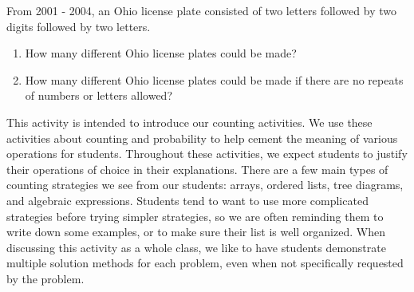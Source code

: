 \documentclass[nooutcomes]{ximera}
\begin{document}
\begin{problem}
From 2001 - 2004, an Ohio license plate consisted of two letters followed by two digits followed by two letters.
\begin{enumerate}
\item How many different Ohio license plates could be made?
\item How many different Ohio license plates could be made if there are no repeats of numbers or letters allowed?
\end{enumerate}
\end{problem}


\newpage
\begin{instructorNotes}
This activity is intended to introduce our counting activities.  We use these activities about counting and probability to help cement the meaning of various operations for students.  Throughout these activities, we expect students to justify their operations of choice in their explanations.  There are a few main types of counting strategies we see from our students: arrays, ordered lists, tree diagrams, and algebraic expressions.  Students tend to want to use more complicated strategies before trying simpler strategies, so we are often reminding them to write down some examples, or to make sure their list is well organized. When discussing this activity as a whole class, we like to have students demonstrate multiple solution methods for each problem, even when not specifically requested by the problem.  

\end{instructorNotes}
\end{document}
